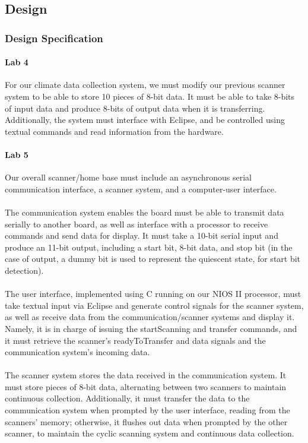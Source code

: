 \documentclass{article}
\begin{document}
  \subsection{Design}
    \subsubsection{Design Specification}
    \paragraph{Lab 4} For our climate data collection system, we must modify our previous scanner system to be able to store 10 pieces of 8-bit data. It must be able to take 8-bits of input data and produce 8-bits of output data when it is transferring. Additionally, the system must interface with Eclipse, and be controlled using textual commands and read information from the hardware.

    \paragraph{Lab 5} Our overall scanner/home base must include an asynchronous serial communication interface, a scanner system, and a computer-user interface.
    \paragraph{} The communication system enables the board must be able to transmit data serially to another board, as well as interface with a processor to receive commands and send data for display. It must take a 10-bit serial input and produce an 11-bit output, including a start bit, 8-bit data, and stop bit (in the case of output, a dummy bit is used to represent the quiescent state, for start bit detection). 
    \paragraph{} The user interface, implemented using C running on our NIOS II processor, must take textual input via Eclipse and generate control signals for the scanner system, as well as receive data from the communication/scanner systems and display it. Namely, it is in charge of issuing the startScanning and transfer commands, and it must retrieve the scanner's readyToTransfer and data signals and the communication system's incoming data.
    \paragraph{} The scanner system stores the data received in the communication system. It must store pieces of 8-bit data, alternating between two scanners to maintain continuous collection. Additionally, it must transfer the data to the communication system when prompted by the user interface, reading from the scanners' memory; otherwise, it flushes out data when prompted by the other scanner, to maintain the cyclic scanning system and continuous data collection.
\end{document}
